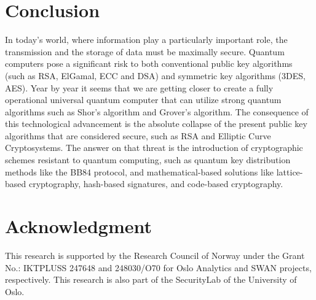 \documentclass[conference, letterpaper]{IEEEtran}
\begin{document}
\section{Conclusion}
In today's world, where information play a particularly important role, the transmission  and the storage of data must be maximally secure. Quantum computers pose a significant risk to both conventional public key algorithms (such as RSA, ElGamal, ECC and DSA) and symmetric key algorithms (3DES, AES). Year by year it seems that we are getting closer to create a fully operational universal quantum computer that can utilize strong quantum algorithms such as Shor's algorithm and Grover's algorithm. The consequence of this technological advancement is the absolute collapse of the present public key algorithms that are considered secure, such as RSA and Elliptic Curve Cryptosystems. The answer on that threat is the introduction of cryptographic schemes resistant to quantum computing, such as quantum key distribution methods like the BB84 protocol, and mathematical-based solutions like lattice-based cryptography, hash-based signatures, and code-based cryptography.

\section*{Acknowledgment}

This research is supported by the Research Council of Norway under the Grant No.: IKTPLUSS 247648 and 248030/O70 for Oslo Analytics and SWAN projects, respectively. This research is also part of the SecurityLab of the University of Oslo.




\end{document}
